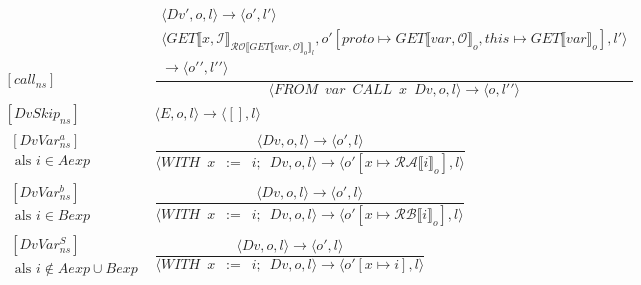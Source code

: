 \documentclass[12pt]{article}
\newcommand{\RA}{\mathcal{RA}}
\newcommand{\RB}{\mathcal{RB}}
\newcommand{\RO}{\mathcal{RO}}
\begin{document}
\[
\begin{matrix}
[call_{ns}] &
\dfrac
{
	\begin{matrix}
	\langle Dv', o, l \rangle \rightarrow \langle o\prime, l\prime \rangle\\
	\langle GET \llbracket x, \mathcal{I} \rrbracket_{\RO \llbracket GET\llbracket var, \mathcal{O} \rrbracket_o \rrbracket_l}, o\prime [proto \mapsto GET\llbracket var, \mathcal{O} \rrbracket_o, this \mapsto GET\llbracket var \rrbracket_o], l\prime \rangle\\
	\rightarrow
	\langle o\prime\prime, l\prime\prime \rangle
	\end{matrix}	
}
{
	\langle FROM \enspace var \enspace CALL \enspace x \enspace Dv,o,l \rangle
	\rightarrow
	\langle o, l\prime\prime \rangle
} \\[60pt]
[DvSkip_{ns}] &
\langle E,o,l \rangle \rightarrow \langle [],l \rangle \\[60pt]
\begin{matrix}
[DvVar_{ns}^{a}]\\
\mbox{ als } i \in Aexp 
\end{matrix}
 &
\dfrac
{	\langle Dv,o,l \rangle \rightarrow \langle o\prime, l \rangle }
{
	\langle WITH \enspace x \enspace := \enspace i; \enspace Dv, o, l \rangle
	\rightarrow
	\langle o\prime[x \mapsto \RA \llbracket i \rrbracket_o], l \rangle
}\\[60pt]
\begin{matrix}
[DvVar_{ns}^{b}]\\
\mbox{ als } i \in Bexp
\end{matrix}
&
\dfrac
{	\langle Dv,o,l \rangle \rightarrow \langle o\prime, l \rangle }
{
	\langle WITH \enspace x \enspace := \enspace i; \enspace Dv, o, l \rangle
	\rightarrow
	\langle o\prime[x \mapsto \RB \llbracket i \rrbracket_o], l \rangle
}\\[60pt]
\begin{matrix}
[DvVar_{ns}^{S}]\\
\mbox{ als } i \notin Aexp \cup Bexp
\end{matrix}
&
\dfrac
{	\langle Dv,o,l \rangle \rightarrow \langle o\prime, l \rangle }
{
	\langle WITH \enspace x \enspace := \enspace i; \enspace Dv, o, l \rangle
	\rightarrow
	\langle o\prime[x \mapsto i ], l \rangle
}\\

\end{matrix}
\]

\end{document}
